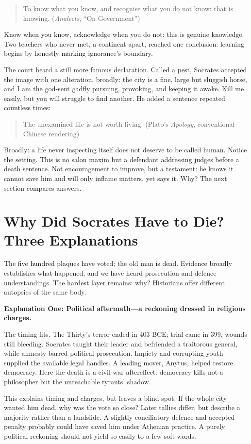 \begin{quote}
To know what you know, and recognise what you do not know: that is knowing. (\textit{Analects}, ``On Government'')
\end{quote}
Know when you know, acknowledge when you do not: this is genuine knowledge. Two teachers who never met, a continent apart, reached one conclusion: learning begins by honestly marking ignorance's boundary.

The court heard a still more famous declaration. Called a pest, Socrates accepted the image with one alteration, broadly: the city is a fine, large but sluggish horse, and I am the god-sent gadfly pursuing, provoking, and keeping it awake. Kill me easily, but you will struggle to find another. He added a sentence repeated countless times:

\begin{quote}
The unexamined life is not worth living. (Plato's \textit{Apology}, conventional Chinese rendering)
\end{quote}
Broadly: a life never inspecting itself does not deserve to be called human. Notice the setting. This is no salon maxim but a defendant addressing judges before a death sentence. Not encouragement to improve, but a testament: he knows it cannot save him and will only inflame matters, yet says it. Why? The next section compares answers.

\section[Why Socrates Had to Die]{Why Did Socrates Have to Die? Three Explanations}
The five hundred plaques have voted; the old man is dead. Evidence broadly establishes what happened, and we have heard prosecution and defence understandings. The hardest layer remains: why? Historians offer different autopsies of the same body.

\textbf{Explanation One: Political aftermath---a reckoning dressed in religious charges.}

The timing fits. The Thirty's terror ended in 403 BCE; trial came in 399, wounds still bleeding. Socrates taught their leader and befriended a traitorous general, while amnesty barred political prosecution. Impiety and corrupting youth supplied the available legal handles. A leading mover, Anytus, helped restore democracy. Here the death is a civil-war aftereffect: democracy kills not a philosopher but the unreachable tyrants' shadow.

This explains timing and charges, but leaves a blind spot. If the whole city wanted him dead, why was the vote so close? Later tallies differ, but describe a majority rather than a landslide. A slightly conciliatory defence and accepted penalty probably could have saved him under Athenian practice. A purely political reckoning should not yield so easily to a few soft words.

